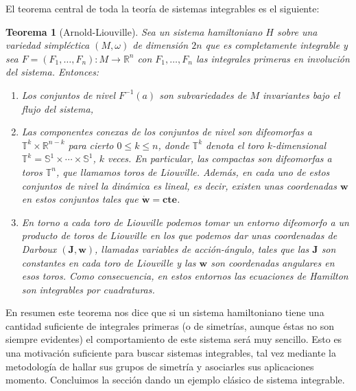 \documentclass[12pt,a4paper,twocolumn,reqno]{amsart}
\newtheorem{thm}{Teorema}[section]
\theoremstyle{definition} \newtheorem{defn}[thm]{Definición}
\theoremstyle{definition} \newtheorem{ejemplo}[thm]{Ejemplo}
\theoremstyle{definition} \newtheorem{ejercicio}[thm]{Ejercicio}
\theoremstyle{remark} \newtheorem*{obs}{Observación}
\def\RR{\mathbb{R}}
\def\TT{\mathbb{T}}
\def\SF{\mathbb{S}}
\newcommand{\vect}[1]{\mathbf{#1}}
\begin{document}
  El teorema central de toda la teoría de sistemas integrables es el siguiente:
  \begin{thm}[Arnold-Liouville]\label{arnoldliouville}
   Sea un sistema hamiltoniano $H$ sobre una variedad simpléctica $(M,\omega)$ de dimensión $2n$ que es completamente integrable y sea $F=(F_1,\dots,F_n):M\rightarrow \RR^n$ con $F_1,\dots,F_n$ las integrales primeras en involución del sistema. Entonces:
   \begin{enumerate}
     \item Los conjuntos de nivel $F^{-1}(a)$ son subvariedades de $M$ invariantes bajo el flujo del sistema,
     \item Las componentes conexas de los conjuntos de nivel son difeomorfas a $\TT^k\times \RR^{n-k}$ para cierto $0\leq k \leq n$, donde $\TT^k$ denota el toro $k$-dimensional $\TT^k=\SF^1\times \cdots \times \SF^1$, $k$ veces. En particular, las compactas son difeomorfas a toros $\TT^n$, que llamamos \emph{toros de Liouville}. Además, en cada uno de estos conjuntos de nivel la dinámica es lineal, es decir, existen unas coordenadas $\vect{w}$ en estos conjuntos tales que $\dot{\vect{w}}=\mathbf{cte}$.
     \item En torno a cada toro de Liouville podemos tomar un entorno difeomorfo a un producto de toros de Liouville en los que podemos dar unas coordenadas de Darboux $(\vect{J},\vect{w})$, llamadas \emph{variables de acción-ángulo}, tales que las $\vect{J}$ son constantes en cada toro de Liouville y las $\vect{w}$ son coordenadas angulares en esos toros. Como consecuencia, en estos entornos las ecuaciones de Hamilton son integrables por cuadraturas.
   \end{enumerate}
  \end{thm}
  En resumen este teorema nos dice que si un sistema hamiltoniano tiene una cantidad suficiente de integrales primeras (o de simetrías, aunque éstas no son siempre evidentes) el comportamiento de este sistema será muy sencillo. Esto es una motivación suficiente para buscar sistemas integrables, tal vez mediante la metodología de hallar sus grupos de simetría y asociarles sus aplicaciones momento. Concluimos la sección dando un ejemplo clásico de sistema integrable.
\end{document}
